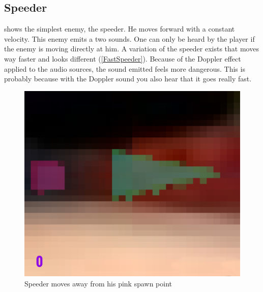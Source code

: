 \newpage
\subsection{Speeder}
 shows the simplest enemy, the speeder. He moves forward with a constant velocity. This enemy emits a two sounds. One can only be heard by the player if the enemy is moving directly at him. A variation of the speeder exists that moves way faster and looks different (\cref{FastSpeeder}). Because of the Doppler effect applied to the audio sources, the sound emitted feels more dangerous. This is probably because with the Doppler sound you also hear that it goes really fast.

\begin{figure}[p]
  \centering
  \includegraphics[width=\imgWidth]{images/game_systems/SpeederSpawns.png}
  \caption{Speeder moves away from his pink spawn point}
  \label{Speeder}
\end{figure}

